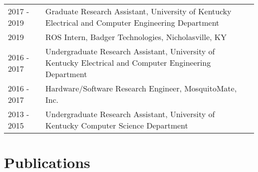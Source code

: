 \documentclass[12pt]{article}
\makeatletter
\newcommand*{\newbibstartnumber}[1]{%
  \apptocmd{\thebibliography}{%
    \global\c@NAT@ctr #1\relax
    \addtocounter{NAT@ctr}{-1}%
  }{}{}%
}
\makeatother
\begin{document}
\begin{tabular}{p{0.15\linewidth} p{0.85\linewidth}}
  2017 - 2019 & {Graduate Research Assistant, University of Kentucky Electrical and Computer Engineering Department} \\
  2019        & ROS Intern, Badger Technologies, Nicholasville, KY \\
  2016 - 2017 & Undergraduate Research Assistant, University of Kentucky Electrical and Computer Engineering Department \\
  2016 - 2017 & Hardware/Software Research Engineer, MosquitoMate, Inc. \\
  2013 - 2015 & Undergraduate Research Assistant, University of Kentucky Computer Science Department \\
\end{tabular}


 
\section{Publications}

\vspace{2mm}
\newbibstartnumber{1}
\begin{bibunit}[plain]
	\nocite{krups}
	\nocite{krepe1}
	\nocite{10.1117/12.2508553}
	\nocite{10.1117/12.2510990}
	\nocite{Yu:20}
\putbib[refs]
\end{bibunit}
	
\end{document}
